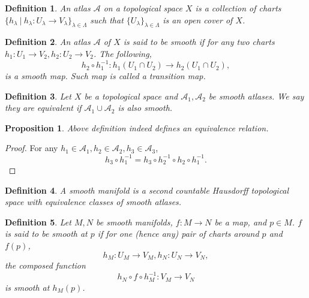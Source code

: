 \documentclass{article}
\newtheorem{proposition}{Proposition}[section]
\newtheorem{definition}{Definition}[section]
\numberwithin{equation}{section}
\begin{document}
\begin{definition}
An atlas $\mathcal{A}$ on a topological space $X$ is a collection of charts $\{h_\lambda\:|\: h_\lambda:U_\lambda\to V_\lambda\}_{\lambda\in \Lambda}$ such that
$\{U_\lambda\}_{\lambda\in\Lambda}$ is an open cover of $X$.
\end{definition}

\begin{definition}
An atlas $\mathcal{A}$ of $X$ is said to be smooth if for any two charts $h_1:U_1\to V_2,h_2:U_2\to V_2$. The following,
\begin{equation*}
h_2\circ h_1^{-1}:h_1(U_1\cap U_2)\to h_2(U_1\cap U_2),
\end{equation*}
is a smooth map. Such map is called a transition map.
\end{definition}

\begin{definition}
Let $X$ be a topological space and $\mathcal{A}_1,\mathcal{A}_2$ be smooth atlases. We say they are equivalent if $\mathcal{A}_1\cup\mathcal{A}_2$ is also smooth.
\end{definition}

\begin{proposition}
Above definition indeed defines an equivalence relation.
\end{proposition}
\begin{proof}
For any $h_1\in \mathcal{A}_1,h_2\in \mathcal{A}_2,h_3\in \mathcal{A}_3$, 
\begin{equation*}
h_3\circ h^{-1}_1 = h_3\circ h^{-1}_2\circ h_2\circ h^{-1}_1.
\end{equation*}
\end{proof}



\begin{definition}
A smooth manifold is a second countable Hausdorff topological space with equivalence classes of smooth atlases.
\end{definition}

\begin{definition}
Let $M,N$ be smooth manifolds, $f:M\to N$ be a map, and $p\in M$. $f$ is said to be smooth at $p$ if for one (hence any) pair of charts around $p$ and $f(p)$, 
\begin{equation*}
h_M:U_M\to V_M, h_N:U_N\to V_N,
\end{equation*}
the composed function 
\begin{equation*}
h_N\circ f \circ h_M^{-1}:V_M\to V_N
\end{equation*}
is smooth at $h_M(p)$.
\end{definition}
\end{document}

